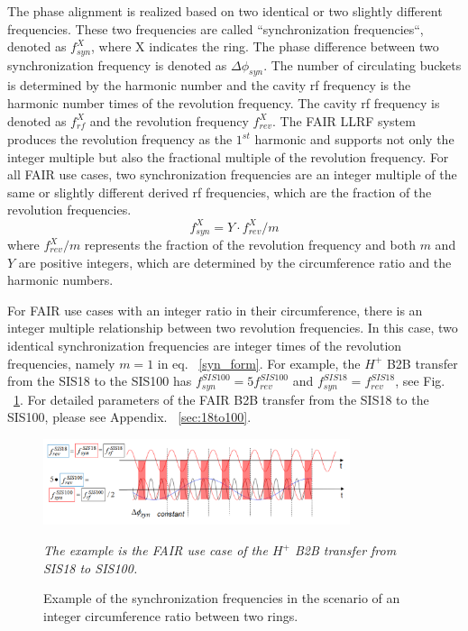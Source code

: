The phase alignment is realized based on two identical or two slightly different frequencies. These two frequencies are called ``synchronization frequencies``, denoted as $f_\mathit{syn}^{X}$, where X indicates the ring. The phase difference between two synchronization frequency is denoted as $\Delta \phi_\mathit{syn}$. The number of circulating buckets is determined by the harmonic number and the cavity rf frequency is the harmonic number times of the revolution frequency. The cavity rf frequency is denoted as $f_\mathit{rf}^{X}$ and the revolution frequency $f_\mathit{rev}^{X}$. The FAIR LLRF system produces the revolution frequency as the $1^{st}$ harmonic and supports not only the integer multiple but also the fractional multiple of the revolution frequency. For all FAIR use cases, two synchronization frequencies are an integer multiple of the same or slightly different derived rf frequencies, which are the fraction of the revolution frequencies.
\begin{equation}
f_\mathit{syn}^{X}= Y\cdot f_\mathit{rev}^{X}/m
\label{syn_form}
\end{equation}
where $f_\mathit{rev}^{X}/m$ represents the fraction of the revolution frequency and both $m$ and $Y$ are positive integers, which are determined by the circumference ratio and the harmonic numbers. 

For FAIR use cases with an integer ratio in their circumference, there is an integer multiple relationship between two revolution frequencies. In this case, two identical synchronization frequencies are integer times of the revolution frequencies, namely $m=1$ in eq. ~\ref{syn_form}. For example, the $H^{+}$ B2B transfer from the SIS18 to the SIS100 has $f_{\mathit{syn}}^{SIS100}=5f_{\mathit{rev}}^{SIS100}$ and $f_{\mathit{syn}}^{SIS18}=f_{\mathit{rev}}^{SIS18}$, see Fig. ~\ref{USIS18}. For detailed parameters of the FAIR B2B transfer from the SIS18 to the SIS100, please see Appendix. ~\ref{sec:18to100}.
\begin{figure}[!htb]
   \centering   
   \includegraphics*[width=90mm]{USIS18.png}
   \caption{Example of the synchronization frequencies in the scenario of an integer circumference ratio between two rings.}
{\textsl{\small{The example is the FAIR use case of the $H^{+}$ B2B transfer from SIS18 to SIS100.}}}
   \label{USIS18}
\end{figure} 

